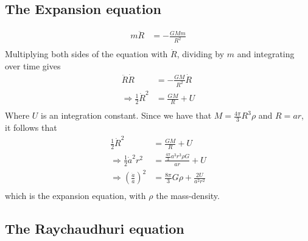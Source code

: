 \documentclass[a4paper, 11pt]{FSKH_623_Report}
\numberwithin{equation}{section}
\begin{document}
\subsection*{The Expansion equation}

\begin{equation}
\begin{split}
m\ddot{R} &= -\frac{GMm}{R^{2}}\\
\end{split}
\end{equation}
Multiplying both sides of the equation with $\dot{R}$, dividing by $m$ and integrating over time gives
\begin{equation}
\begin{split}
\ddot{R}\dot{R} &= -\frac{GM}{R^{2}}\dot{R}\\
\Rightarrow\frac{1}{2}\dot{R}^2 &= \frac{GM}{R}+U\\
\end{split}
\end{equation}
Where $U$ is an integration constant. Since we have that $M=\frac{4\pi}{3}R^{3}\rho$ and $R=ar$, it follows that
\begin{equation}
\begin{split}
\frac{1}{2}\dot{R}^2 &= \frac{GM}{R}+U\\
\Rightarrow\frac{1}{2}\dot{a}^{2}r^{2} &= \frac{\frac{4\pi}{3}a^{3}r^{3}\rho G}{ar}+U\\
\Rightarrow\left(\frac{\dot{a}}{a}\right)^{2} &= \frac{8\pi}{3}G\rho+\frac{2U}{a^{2}r^{2}}\\
\end{split}
\end{equation}
which is the expansion equation, with $\rho$ the mass-density.

\subsection*{The Raychaudhuri equation}
\end{document}
